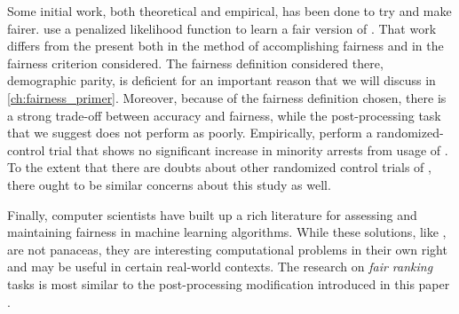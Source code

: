 Some initial work, both theoretical and empirical, has been done to try and make \pp fairer. \citet{mohler_penalized_2018} use a penalized likelihood function to learn a fair version of \pp. That work differs from the present both in the method of accomplishing fairness and in the fairness criterion considered. The fairness definition considered there, demographic parity, is deficient for an important reason that we will discuss in \autoref{ch:fairness_primer}. Moreover, because of the fairness definition chosen, there is a strong trade-off between accuracy and fairness, while the post-processing task that we suggest does not perform as poorly. Empirically, \citet{brantingham_does_2018} perform a randomized-control trial that shows no significant increase in minority arrests from usage of \pp. To the extent that there are doubts about other randomized control trials of \pp, there ought to be similar concerns about this study as well.

Finally, computer scientists have built up a rich literature for assessing and maintaining fairness in machine learning algorithms. While these solutions, like \pp, are not panaceas, they are interesting computational problems in their own right and may be useful in certain real-world contexts. The research on \emph{fair ranking} tasks is most similar to the post-processing modification introduced in this paper \citep{celis_ranking_2017,zehlike_fa*ir:_2017,singh_fairness_2018}.

